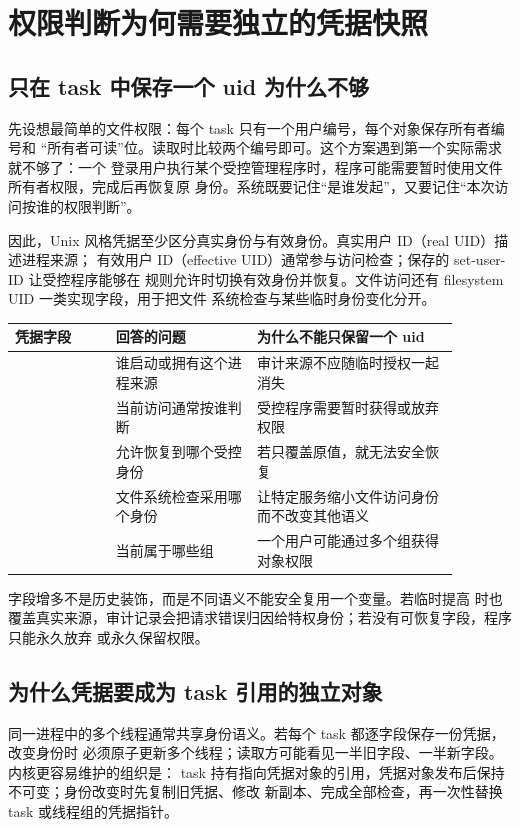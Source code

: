 \section{权限判断为何需要独立的凭据快照}

\subsection{只在 task 中保存一个 uid 为什么不够}

先设想最简单的文件权限：每个 task 只有一个用户编号，每个对象保存所有者编号和
“所有者可读”位。读取时比较两个编号即可。这个方案遇到第一个实际需求就不够了：一个
登录用户执行某个受控管理程序时，程序可能需要暂时使用文件所有者权限，完成后再恢复原
身份。系统既要记住“是谁发起”，又要记住“本次访问按谁的权限判断”。

因此，Unix 风格凭据至少区分真实身份与有效身份。真实用户 ID（real UID）描述进程来源；
有效用户 ID（effective UID）通常参与访问检查；保存的 set-user-ID 让受控程序能够在
规则允许时切换有效身份并恢复。文件访问还有 filesystem UID 一类实现字段，用于把文件
系统检查与某些临时身份变化分开。

\begin{longtable}{|L{0.20\linewidth}|L{0.28\linewidth}|L{0.40\linewidth}|}
\hline
凭据字段 & 回答的问题 & 为什么不能只保留一个 uid \\ \hline
{} & 谁启动或拥有这个进程来源 & 审计来源不应随临时授权一起消失 \\ \hline
{} & 当前访问通常按谁判断 & 受控程序需要暂时获得或放弃权限 \\ \hline
{} & 允许恢复到哪个受控身份 & 若只覆盖原值，就无法安全恢复 \\ \hline
{} & 文件系统检查采用哪个身份 & 让特定服务缩小文件访问身份而不改变其他语义 \\ \hline
{} & 当前属于哪些组 & 一个用户可能通过多个组获得对象权限 \\ \hline
\end{longtable}

字段增多不是历史装饰，而是不同语义不能安全复用一个变量。若临时提高  时也
覆盖真实来源，审计记录会把请求错误归因给特权身份；若没有可恢复字段，程序只能永久放弃
或永久保留权限。

\subsection{为什么凭据要成为 task 引用的独立对象}

同一进程中的多个线程通常共享身份语义。若每个 task 都逐字段保存一份凭据，改变身份时
必须原子更新多个线程；读取方可能看见一半旧字段、一半新字段。内核更容易维护的组织是：
task 持有指向凭据对象的引用，凭据对象发布后保持不可变；身份改变时先复制旧凭据、修改
新副本、完成全部检查，再一次性替换 task 或线程组的凭据指针。


